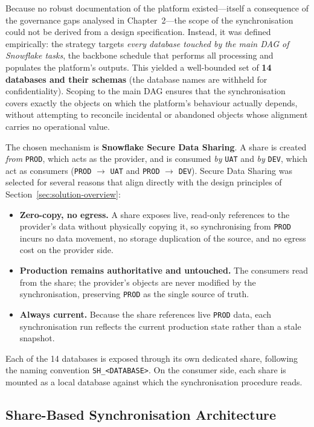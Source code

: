 Because no robust documentation of the platform existed---itself a consequence of the governance gaps analysed in Chapter~2---the scope of the synchronisation could not be derived from a design specification. Instead, it was defined empirically: the strategy targets \emph{every database touched by the main DAG of Snowflake tasks}, the backbone schedule that performs all processing and populates the platform's outputs. This yielded a well-bounded set of \textbf{14 databases and their schemas} (the database names are withheld for confidentiality). Scoping to the main DAG ensures that the synchronisation covers exactly the objects on which the platform's behaviour actually depends, without attempting to reconcile incidental or abandoned objects whose alignment carries no operational value.

The chosen mechanism is \textbf{Snowflake Secure Data Sharing}. A share is created \emph{from} \texttt{PROD}, which acts as the provider, and is consumed \emph{by} \texttt{UAT} and \emph{by} \texttt{DEV}, which act as consumers (\texttt{PROD} $\rightarrow$ \texttt{UAT} and \texttt{PROD} $\rightarrow$ \texttt{DEV}). Secure Data Sharing was selected for several reasons that align directly with the design principles of Section~\ref{sec:solution-overview}:

\begin{itemize}
  \item \textbf{Zero-copy, no egress.} A share exposes live, read-only references to the provider's data without physically copying it, so synchronising from \texttt{PROD} incurs no data movement, no storage duplication of the source, and no egress cost on the provider side.
  \item \textbf{Production remains authoritative and untouched.} The consumers read from the share; the provider's objects are never modified by the synchronisation, preserving \texttt{PROD} as the single source of truth.
  \item \textbf{Always current.} Because the share references live \texttt{PROD} data, each synchronisation run reflects the current production state rather than a stale snapshot.
\end{itemize}

Each of the 14 databases is exposed through its own dedicated share, following the naming convention \texttt{SH\_<DATABASE>}. On the consumer side, each share is mounted as a local database against which the synchronisation procedure reads.

\subsection{Share-Based Synchronisation Architecture}
\label{subsec:sync-arch}


